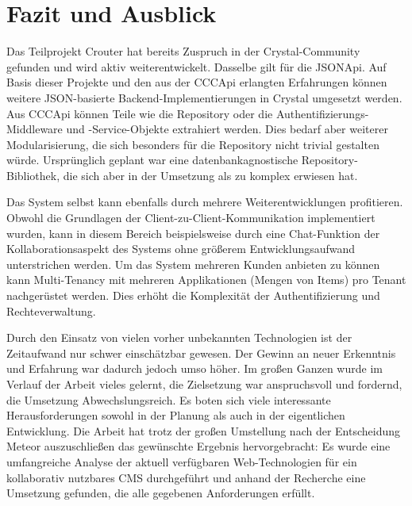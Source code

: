 \section{Fazit und Ausblick}
\label{sec:d_fazit_und_ausblick}

Das Teilprojekt Crouter hat bereits Zuspruch in der Crystal-Community gefunden
und wird aktiv weiterentwickelt.  Dasselbe gilt für die JSONApi.  Auf Basis
dieser Projekte und den aus der CCCApi erlangten Erfahrungen können weitere
JSON-basierte Backend-Implementierungen in Crystal umgesetzt werden.  Aus
CCCApi können Teile wie die Repository oder die Authentifizierungs-Middleware
und -Service-Objekte extrahiert werden.  Dies bedarf aber weiterer
Modularisierung, die sich besonders für die Repository nicht trivial gestalten
würde.  Ursprünglich geplant war eine datenbankagnostische
Repository-Bibliothek, die sich aber in der Umsetzung als zu komplex erwiesen
hat.

Das System selbst kann ebenfalls durch mehrere Weiterentwicklungen profitieren.
Obwohl die Grundlagen der Client-zu-Client-Kommunikation implementiert wurden,
kann in diesem Bereich beispielsweise durch eine Chat-Funktion der
Kollaborationsaspekt des Systems ohne größerem Entwicklungsaufwand
unterstrichen werden.  Um das System mehreren Kunden anbieten zu können kann
Multi-Tenancy mit mehreren Applikationen (Mengen von Items) pro Tenant
nachgerüstet werden.  Dies erhöht die Komplexität der Authentifizierung und
Rechteverwaltung.

Durch den Einsatz von vielen vorher unbekannten Technologien ist der
Zeitaufwand nur schwer einschätzbar gewesen.  Der Gewinn an neuer Erkenntnis
und Erfahrung war dadurch jedoch umso höher.  Im großen Ganzen wurde im Verlauf
der Arbeit vieles gelernt,  die Zielsetzung war anspruchsvoll und fordernd, die
Umsetzung Abwechslungsreich.  Es boten sich viele interessante
Herausforderungen sowohl in der Planung als auch in der eigentlichen
Entwicklung.  Die Arbeit hat trotz der großen Umstellung nach der Entscheidung
Meteor auszuschließen das gewünschte Ergebnis hervorgebracht:  Es wurde eine
umfangreiche Analyse der aktuell verfügbaren Web-Technologien für ein
kollaborativ nutzbares CMS durchgeführt und anhand der Recherche eine Umsetzung
gefunden, die alle gegebenen Anforderungen erfüllt.
